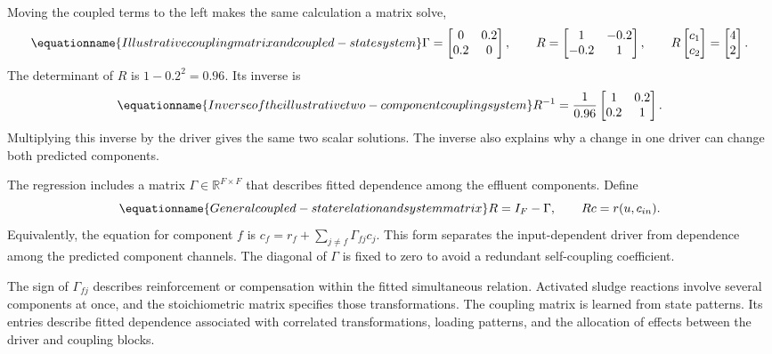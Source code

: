Moving the coupled terms to the left makes the same calculation a matrix solve,
\begin{equation}
\equationname{Illustrative coupling matrix and coupled-state system}
\label{eq:icsor_small_coupling_matrices}
\Gamma=\begin{bmatrix}0&0.2\\0.2&0\end{bmatrix},
\qquad
R=\begin{bmatrix}1&-0.2\\-0.2&1\end{bmatrix},
\qquad
R\begin{bmatrix}c_1\\c_2\end{bmatrix}=\begin{bmatrix}4\\2\end{bmatrix}.
\end{equation}
The determinant of \(R\) is \(1-0.2^2=0.96\). Its inverse is
\begin{equation}
\equationname{Inverse of the illustrative two-component coupling system}
\label{eq:icsor_small_coupling_inverse}
R^{-1}=\frac{1}{0.96}\begin{bmatrix}1&0.2\\0.2&1\end{bmatrix}.
\end{equation}
Multiplying this inverse by the driver gives the same two scalar solutions. The inverse also explains why a change in one driver can change both predicted components.

The regression includes a matrix \(\Gamma\in\mathbb{R}^{F\times F}\) that describes fitted dependence among the effluent components. Define
\begin{equation}
\equationname{General coupled-state relation and system matrix}
\label{eq:icsor_coupled_relation}
R=I_F-\Gamma,
\qquad Rc=r(u,c_{in}).
\end{equation}
Equivalently, the equation for component \(f\) is \(c_f=r_f+\sum_{j\neq f}\Gamma_{fj}c_j\). This form separates the input-dependent driver from dependence among the predicted component channels. The diagonal of \(\Gamma\) is fixed to zero to avoid a redundant self-coupling coefficient.

The sign of \(\Gamma_{fj}\) describes reinforcement or compensation within the fitted simultaneous relation. Activated sludge reactions involve several components at once, and the stoichiometric matrix specifies those transformations. The coupling matrix is learned from state patterns. Its entries describe fitted dependence associated with correlated transformations, loading patterns, and the allocation of effects between the driver and coupling blocks.

